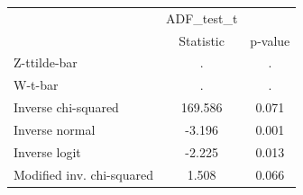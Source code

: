 \begin{tabular}{l*{2}{c}}
\hline\hline
            &  ADF\_test\_t&            \\
            &   Statistic&     p-value\\
\hline
Z-ttilde-bar&           .&           .\\
W-t-bar     &           .&           .\\
Inverse chi-squared&     169.586&       0.071\\
Inverse normal&      -3.196&       0.001\\
Inverse logit&      -2.225&       0.013\\
Modified inv. chi-squared&       1.508&       0.066\\
\hline\hline
\end{tabular}
